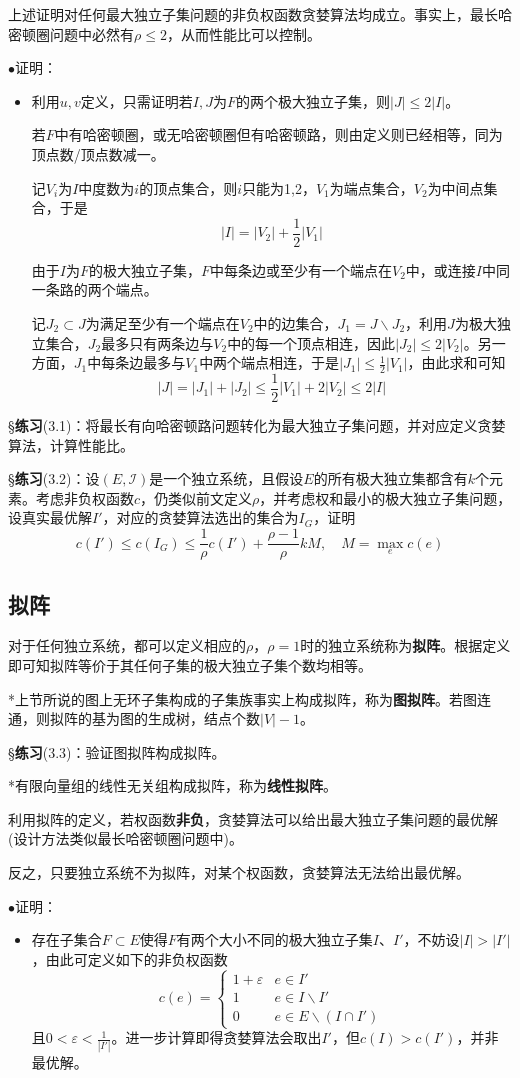 \documentclass[a4paper,UTF8,fontset=windows]{ctexart}
\newcommand{\exce}[2]{\S\textbf{练习}(#1)：{\kaishu #2}}
\newcommand{\proo}[1]{{\kaishu $\bullet$证明：
\begin{itemize}
    \item[] #1
\end{itemize}
}}
\begin{document}
上述证明对任何最大独立子集问题的非负权函数贪婪算法均成立。事实上，最长哈密顿圈问题中必然有$\rho\le2$，从而性能比可以控制。

\proo{
    利用$u,v$定义，只需证明若$I,J$为$F$的两个极大独立子集，则$|J|\le 2|I|$。

    若$F$中有哈密顿圈，或无哈密顿圈但有哈密顿路，则由定义则已经相等，同为顶点数/顶点数减一。

    记$V_i$为$I$中度数为$i$的顶点集合，则$i$只能为1,2，$V_1$为端点集合，$V_2$为中间点集合，于是
    $$|I|=|V_2|+\frac{1}{2}|V_1|$$

    由于$I$为$F$的极大独立子集，$F$中每条边或至少有一个端点在$V_2$中，或连接$I$中同一条路的两个端点。

    记$J_2\subset J$为满足至少有一个端点在$V_2$中的边集合，$J_1=J\backslash J_2$，利用$J$为极大独立集合，$J_2$最多只有两条边与$V_2$中的每一个顶点相连，因此$|J_2|\le 2|V_2|$。另一方面，$J_1$中每条边最多与$V_1$中两个端点相连，于是$|J_1|\le\frac{1}{2}|V_1|$，由此求和可知
    $$|J|=|J_1|+|J_2|\le\frac{1}{2}|V_1|+2|V_2|\le 2|I|$$
}

\exce{3.1}{将最长有向哈密顿路问题转化为最大独立子集问题，并对应定义贪婪算法，计算性能比。}

\exce{3.2}{设$(E,\mathcal{I})$是一个独立系统，且假设$E$的所有极大独立集都含有$k$个元素。考虑非负权函数$c$，仍类似前文定义$\rho$，并考虑权和最小的极大独立子集问题，设真实最优解$I'$，对应的贪婪算法选出的集合为$I_G$，证明
$$c(I')\le c(I_G)\le\frac{1}{\rho}c(I')+\frac{\rho-1}{\rho}kM,\quad M=\max_ec(e)$$}

\subsection{拟阵}
对于任何独立系统，都可以定义相应的$\rho$，$\rho=1$时的独立系统称为\textbf{拟阵}。根据定义即可知拟阵等价于其任何子集的极大独立子集个数均相等。

*上节所说的图上无环子集构成的子集族事实上构成拟阵，称为\textbf{图拟阵}。若图连通，则拟阵的基为图的生成树，结点个数$|V|-1$。

\exce{3.3}{验证图拟阵构成拟阵。}

*有限向量组的线性无关组构成拟阵，称为\textbf{线性拟阵}。

利用拟阵的定义，若权函数\textbf{非负}，贪婪算法可以给出最大独立子集问题的最优解(设计方法类似最长哈密顿圈问题中)。

反之，只要独立系统不为拟阵，对某个权函数，贪婪算法无法给出最优解。

\proo{
    存在子集合$F\subset E$使得$F$有两个大小不同的极大独立子集$I$、$I'$，不妨设$|I|>|I'|$，由此可定义如下的非负权函数
    $$c(e)=\begin{cases}1+\varepsilon&e\in I'\\1&e\in I\backslash I'\\0&e\in E\backslash(I\cap I')\end{cases}$$
    且$0<\varepsilon<\frac{1}{|I'|}$。进一步计算即得贪婪算法会取出$I'$，但$c(I)>c(I')$，并非最优解。
}
\end{document}
